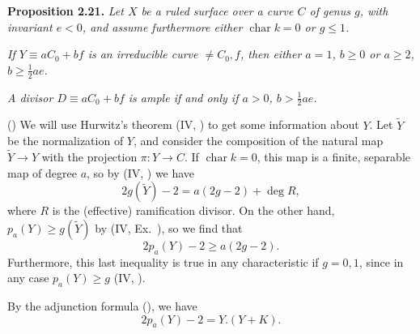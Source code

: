 {\medskip
\noindent\hypertarget{result-V-2.21}{}\textbf{Proposition 2.21.} \emph{Let $X$ be a ruled surface over a curve $C$ of genus $g$, with invariant $e<0$, and assume furthermore either $\operatorname{char}k=0$ or $g\le1$.}
\begin{parts}
\item\hypertarget{result-V-2.21a}{} \emph{If $Y\equiv aC_0+bf$ is an irreducible curve $\ne C_0,f$, then either $a=1$, $b\ge0$ or $a\ge2$, $b\ge\frac12ae$.}
\item\hypertarget{result-V-2.21b}{} \emph{A divisor $D\equiv aC_0+bf$ is ample if and only if $a>0$, $b>\frac12ae$.}
\end{parts}
\Proof\par
() We will use Hurwitz's theorem (IV, ) to get some information about $Y$. Let $\widetilde Y$ be the normalization of $Y$, and consider the composition of the natural map $\widetilde Y\to Y$ with the projection $\pi\colon Y\to C$. If $\operatorname{char}k=0$, this map is a finite, separable map of degree $a$, so by (IV, ) we have
\[
2g(\widetilde Y)-2=a(2g-2)+\deg R,
\]
\noindent where $R$ is the (effective) ramification divisor. On the other hand, $p_a(Y)\ge g(\widetilde Y)$ by (IV, Ex.~), so we find that
\[
2p_a(Y)-2\ge a(2g-2).
\]
\noindent Furthermore, this last inequality is true in any characteristic if $g=0,1$, since in any case $p_a(Y)\ge g$ (IV, ).

By the adjunction formula (), we have
\[
2p_a(Y)-2=Y.(Y+K).
\]
}
